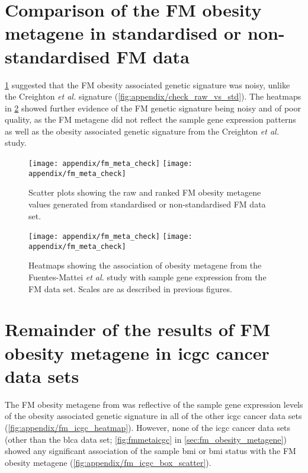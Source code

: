 \begin{appendices}
	\section{Comparison of the FM obesity metagene in standardised or non-standardised FM data}
	\label{sec:fm_metagene_raw_vs_std}

	\noindent
	\cref{fig:appendix/fm_meta_check} suggested that the FM obesity associated genetic signature was noisy, unlike the Creighton \textit{et al.} signature (\cref{fig:appendix/check_raw_vs_std}).
	The heatmaps in \cref{fig:appendix/fm_meta_heat} showed further evidence of the FM genetic signature being noisy and of poor quality, as the FM metagene did not reflect the sample gene expression patterns as well as the obesity associated genetic signature from the Creighton \textit{et al.} study.

	\begin{figure}[htpb]
		\centering
		\texttt{[image: appendix/fm\_meta\_check]}
		\hfill
		\texttt{[image: appendix/fm\_meta\_check]}\\
		\caption{Scatter plots showing the raw and ranked FM obesity metagene values generated from standardised or non-standardised FM data set. }
		\label{fig:appendix/fm_meta_check}
	\end{figure}
	
	\begin{figure}[htpb]
		\centering
		\texttt{[image: appendix/fm\_meta\_check]}
		\hfill
		\texttt{[image: appendix/fm\_meta\_check]}\\
		\caption{Heatmaps showing the association of obesity metagene from the Fuentes-Mattei \textit{et al.} study with sample gene expression from the FM data set.
		Scales are as described in previous figures.}
		\label{fig:appendix/fm_meta_heat}
	\end{figure}

	\section{Remainder of the results of FM obesity metagene in \gls{icgc} cancer data sets}
	\label{sec:rest_of_the_fm_icgc_cancer_heatmap_results}

	\noindent
	The FM obesity metagene from was reflective of the sample gene expression levels of the obesity associated genetic signature in all of the other \gls{icgc} cancer data sets (\cref{fig:appendix/fm_icgc_heatmap}).
	However, none of the \gls{icgc} cancer data sets (other than the \gls{blca} data set; \cref{fig:fmmetaicgc} in \cref{sec:fm_obesity_metagene}) showed any significant association of the sample \gls{bmi} or \gls{bmi} status with the FM obesity metagene (\cref{fig:appendix/fm_icgc_box_scatter}).


\end{appendices}
